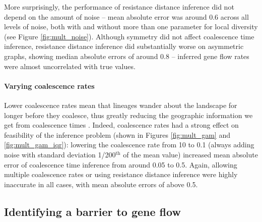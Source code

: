 \documentclass{article}
\begin{document}
More surprisingly, the performance of resistance distance inference 
did not depend on the amount of noise --
mean absolute error was around 0.6 across all levels of noise,
both with and without more than one parameter for local diversity
(see Figure \ref{fig:mult_noise}).
Although symmetry did not affect coalescence time inference,
resistance distance inference did substantially worse on asymmetric graphs,
showing median absolute errors of around 0.8 --
inferred gene flow rates were almost uncorrelated with true values.

\paragraph{Varying coalescence rates}
Lower coalescence rates mean that lineages wander about the landscape for longer
before they coalesce,  
thus greatly reducing the geographic information we get from coalescence times 
\citep{wilkins2004separationoftimescales}.
Indeed, coalescence rates had a strong effect on feasibility of the inference problem
(shown in Figures \ref{fig:mult_gam} and \ref{fig:mult_gam_iqr}):
lowering the coalescence rate from 10 to 0.1
(always adding noise with standard deviation 1/200$^\text{th}$ of the mean value)
increased mean absolute error of coalescence time inference from around 0.05 to 0.5.
Again, allowing multiple coalescence rates
or using resistance distance inference were highly inaccurate in all cases,
with mean absolute errors of above 0.5.


\subsection*{Identifying a barrier to gene flow}
\label{sec:5x3b}
\end{document}
